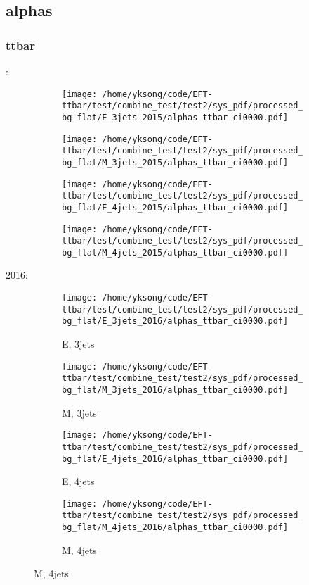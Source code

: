 \documentclass{beamer}
\begin{document}
\subsection{alphas}

\begin{frame}
\frametitle{ttbar}
\fontsize{5}{1}:
\begin{figure}
\centering
\begin{subfigure}[b]{0.24\textwidth}
\texttt{[image: /home/yksong/code/EFT-ttbar/test/combine\_test/test2/sys\_pdf/processed\_bg\_flat/E\_3jets\_2015/alphas\_ttbar\_ci0000.pdf]}
\end{subfigure}
\begin{subfigure}[b]{0.24\textwidth}
\texttt{[image: /home/yksong/code/EFT-ttbar/test/combine\_test/test2/sys\_pdf/processed\_bg\_flat/M\_3jets\_2015/alphas\_ttbar\_ci0000.pdf]}
\end{subfigure}
\begin{subfigure}[b]{0.24\textwidth}
\texttt{[image: /home/yksong/code/EFT-ttbar/test/combine\_test/test2/sys\_pdf/processed\_bg\_flat/E\_4jets\_2015/alphas\_ttbar\_ci0000.pdf]}
\end{subfigure}
\begin{subfigure}[b]{0.24\textwidth}
\texttt{[image: /home/yksong/code/EFT-ttbar/test/combine\_test/test2/sys\_pdf/processed\_bg\_flat/M\_4jets\_2015/alphas\_ttbar\_ci0000.pdf]}
\end{subfigure}
\end{figure}
2016:
\begin{figure}
\centering
\begin{subfigure}[b]{0.24\textwidth}
\texttt{[image: /home/yksong/code/EFT-ttbar/test/combine\_test/test2/sys\_pdf/processed\_bg\_flat/E\_3jets\_2016/alphas\_ttbar\_ci0000.pdf]}
\captionsetup{font=tiny}
\caption{E, 3jets}
\end{subfigure}
\begin{subfigure}[b]{0.24\textwidth}
\texttt{[image: /home/yksong/code/EFT-ttbar/test/combine\_test/test2/sys\_pdf/processed\_bg\_flat/M\_3jets\_2016/alphas\_ttbar\_ci0000.pdf]}
\captionsetup{font=tiny}
\caption{M, 3jets}
\end{subfigure}
\begin{subfigure}[b]{0.24\textwidth}
\texttt{[image: /home/yksong/code/EFT-ttbar/test/combine\_test/test2/sys\_pdf/processed\_bg\_flat/E\_4jets\_2016/alphas\_ttbar\_ci0000.pdf]}
\captionsetup{font=tiny}
\caption{E, 4jets}
\end{subfigure}
\begin{subfigure}[b]{0.24\textwidth}
\texttt{[image: /home/yksong/code/EFT-ttbar/test/combine\_test/test2/sys\_pdf/processed\_bg\_flat/M\_4jets\_2016/alphas\_ttbar\_ci0000.pdf]}
\captionsetup{font=tiny}
\caption{M, 4jets}
\end{subfigure}
\end{figure}
\end{frame}
\end{document}
